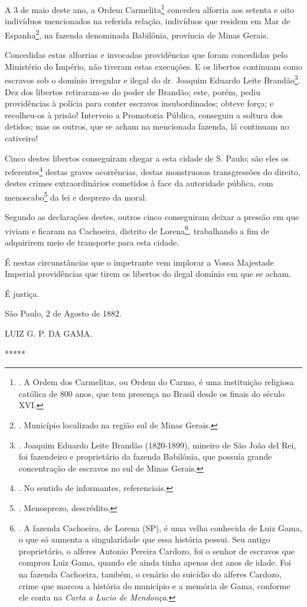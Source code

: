 A 3 de maio deste ano, a Ordem Carmelita\footnote{. A Ordem dos
  Carmelitas, ou Ordem do Carmo, é uma instituição religiosa católica de
  800 anos, que tem presença no Brasil desde os finais do século XVI.}
concedeu alforria aos setenta e oito indivíduos mencionados na referida
relação, indivíduos que residem em Mar de Espanha\footnote{. Município
  localizado na região sul de Minas Gerais.}, na fazenda denominada
Babilônia, província de Minas Gerais.

Concedidas estas alforrias e invocadas providências que foram concedidas
pelo Ministério do Império, não tiveram estas execuções. E os libertos
continuam como escravos sob o domínio irregular e ilegal do dr. Joaquim
Eduardo Leite Brandão\footnote{. Joaquim Eduardo Leite Brandão
  (1820-1899), mineiro de São João del Rei, foi fazendeiro e
  proprietário da fazenda Babilônia, que possuía grande concentração de
  escravos no sul de Minas Gerais.}. Dez dos libertos retiraram-se do
poder de Brandão; este, porém, pediu providências à polícia para conter
escravos insubordinados; obteve força; e recolheu-os à prisão! Interveio
a Promotoria Pública, conseguiu a soltura dos detidos; mas os outros,
que se acham na mencionada fazenda, lá continuam no cativeiro!

Cinco destes libertos conseguiram chegar a esta cidade de S. Paulo; são
eles os referentes\footnote{. No sentido de informantes, referenciais.}
destas graves ocorrências, destas monstruosas transgressões do direito,
destes crimes extraordinários cometidos à face da autoridade pública,
com menoscabo\footnote{. Menosprezo, descrédito.} da lei e desprezo da
moral.

Segundo as declarações destes, outros cinco conseguiram deixar a pressão
em que viviam e ficaram na Cachoeira, distrito de Lorena\footnote{. A
  fazenda Cachoeira, de Lorena (SP), é uma velha conhecida de Luiz Gama,
  o que só aumenta a singularidade que essa história possui. Seu antigo
  proprietário, o alferes Antonio Pereira Cardozo, foi o senhor de
  escravos que comprou Luiz Gama, quando ele ainda tinha apenas dez anos
  de idade. Foi na fazenda Cachoeira, também, o cenário do suicídio do
  alferes Cardozo, crime que marcou a história do município e a memória
  de Gama, conforme ele conta na \emph{Carta a Lucio de Mendonça}.},
trabalhando a fim de adquirirem meio de transporte para esta cidade.

É nestas circunstâncias que o impetrante vem implorar a Vossa Majestade
Imperial providências que tirem os libertos do ilegal domínio em que se
acham.

É justiça.

São Paulo, 2 de Agosto de 1882.

LUIZ G. P. DA GAMA.

*****
